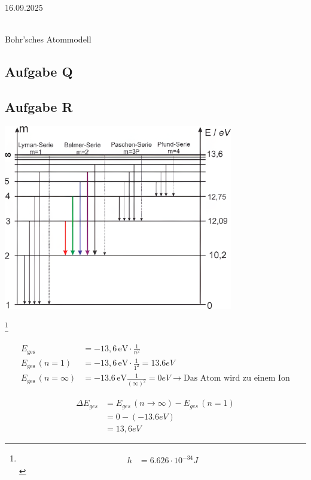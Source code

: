 \documentclass[11pt,a4paper,oneside]{article}
\newcommand{\lessondate}[1]{\noindent\hfill\textcolor{MarginalGray}{\textsc{#1}} \\ \vspace{0.5cm}}
\begin{document}
	\lessondate{16.09.2025}\\
	
	\begin{loesung}{Bohr'sches Atommodell}
		\subsection*{Aufgabe Q}
		\subsection*{Aufgabe R}
		\begin{center}
			\includegraphics[width=0.75\textwidth]{Energie1.png}
		\end{center}
		
		\footnote{
		\begin{align*}
			h &= 6.626 \cdot 10^{-34} J 
		\end{align*}
		}
	\end{loesung}
	
	\begin{align*}
		E_\text{ges} &= -13{,}6\,\mathrm{eV} \cdot \frac{1}{n^2} \\
		E_\text{ges}\,(n=1) &= -13{,}6\,\mathrm{eV} \cdot \frac{1}{1^2} = \boxed{13.6 eV}\\
		E_\text{ges}\, (n = \infty) &= -13.6\, \mathrm{eV} \frac{1}{(\infty)^2} = \boxed{0 eV} \rightarrow \text{Das Atom wird zu einem Ion}
	\end{align*}
	
	\begin{align*}
		\Delta E_{ges} &= E_{ges}\, (n \rightarrow \infty) - E_{ges}\, (n = 1) \\
		&= 0 - (-13.6 eV)\\
		&=  \boxed{13,6 eV}
	\end{align*}
	
\end{document}
